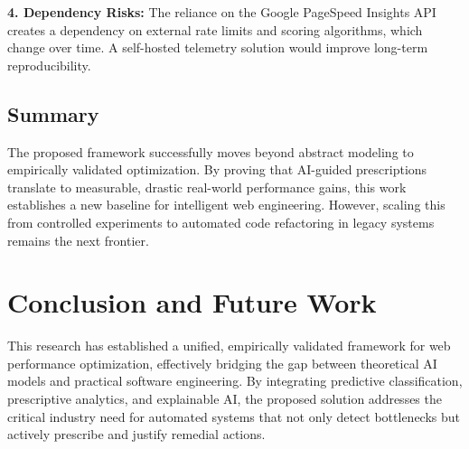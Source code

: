 \documentclass[sn-nature]{sn-jnl}
\begin{document}
\textbf{4. Dependency Risks:} The reliance on the Google PageSpeed Insights API creates a dependency on external rate limits and scoring algorithms, which change over time. A self-hosted telemetry solution would improve long-term reproducibility.

\subsection{Summary}

The proposed framework successfully moves beyond abstract modeling to empirically validated optimization. By proving that AI-guided prescriptions translate to measurable, drastic real-world performance gains, this work establishes a new baseline for intelligent web engineering. However, scaling this from controlled experiments to automated code refactoring in legacy systems remains the next frontier.


\section{Conclusion and Future Work}\label{sec8}

This research has established a unified, empirically validated framework for web performance optimization, effectively bridging the gap between theoretical AI models and practical software engineering. By integrating predictive classification, prescriptive analytics, and explainable AI, the proposed solution addresses the critical industry need for automated systems that not only detect bottlenecks but actively prescribe and justify remedial actions.
\end{document}
